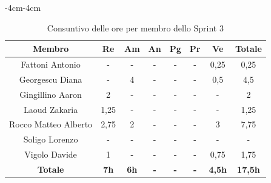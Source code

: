 \documentclass[a4paper,12pt]{article}
\begin{document}
\begin{table}[H]
    \begin{adjustwidth}{-4cm}{-4cm}
    \centering
    \begin{tabular}{|c|c|c|c|c|c|c|c|}
        \hline
        \textbf{Membro}         & \textbf{Re}   & \textbf{Am}   & \textbf{An}   & \textbf{Pg}   & \textbf{Pr}   & \textbf{Ve}   & \textbf{Totale} \\
        \hline
        Fattoni Antonio         & -             & -             & -             & -             & -             & 0,25          & 0,25 \\
        \hline
        Georgescu Diana         & -             & 4             & -             & -             & -             & 0,5           & 4,5 \\
        \hline
        Gingillino Aaron        & 2             & -             & -             & -             & -             & -             & 2 \\
        \hline
        Laoud Zakaria           & 1,25          & -             & -             & -             & -             & -             & 1,25 \\
        \hline
        Rocco Matteo Alberto    & 2,75          & 2             & -             & -             & -             & 3             & 7,75 \\
        \hline
        Soligo Lorenzo          & -             & -             & -             & -             & -             & -             & - \\
        \hline
        Vigolo Davide           & 1             & -             & -             & -             & -             & 0,75          & 1,75\\
        \hline
        \textbf{Totale}         &\textbf{7h}    &\textbf{6h}    &\textbf{-}     &\textbf{-}     &\textbf{-}     &\textbf{4,5h}  &\textbf{17,5h}\\
        \hline
    \end{tabular}
    \caption{Consuntivo delle ore per membro dello Sprint 3}
    \end{adjustwidth}
\end{table}
\end{document}
